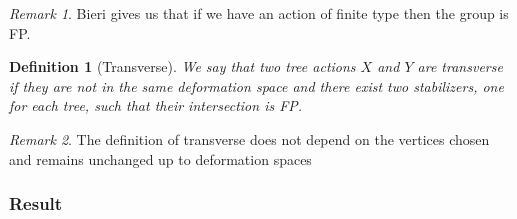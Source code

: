 \documentclass{article}
\theoremstyle{mystyle}
\newtheorem{defn}{Definition}
\theoremstyle{remark}
\newtheorem{rmk}{Remark}[section]
\begin{document}
\begin{rmk}
    Bieri gives us that if we have an action of finite type then the group is FP.
\end{rmk}

\begin{defn}[Transverse]
    We say that two tree actions $X$ and $Y$ are \emph{transverse} if they are not in the same deformation space and there exist two stabilizers, one for each tree, such that their intersection is FP.
\end{defn}

\begin{rmk}
    The definition of transverse does not depend on the vertices chosen and remains unchanged up to deformation spaces
\end{rmk}

\subsubsection{Result}
\end{document}
